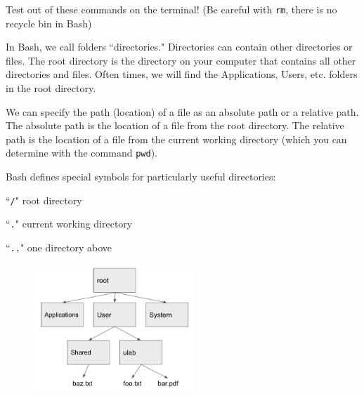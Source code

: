 \documentclass[addpoints,12pt]{exam}
\numberwithin{equation}{section}
\begin{document}
\begin{questions}
		
		Test out of these commands on the terminal! (Be careful with \verb|rm|, there is no recycle bin in Bash)
		
		\newpage
		
		\question[10] In Bash, we call folders ``directories." Directories can contain other directories or files. The root directory is the directory on your computer that contains all other directories and files. Often times, we will find the Applications, Users, etc. folders in the root directory.
		
		We can specify the path (location) of a file as an absolute path or a relative path. The absolute path is the location of a file from the root directory. The relative path is the location of a file from the current working directory (which you can determine with the command \verb|pwd|).
		
		Bash defines special symbols for particularly useful directories:
		
		``\verb|/|" root directory
		
		``\verb|.|" current working directory
		
		``\verb|..|" one directory above
		
		\begin{figure}[H]
			\centering
			\includegraphics[width=6cm] {dir.png}
		\end{figure}
		

\end{questions}
\end{document}
